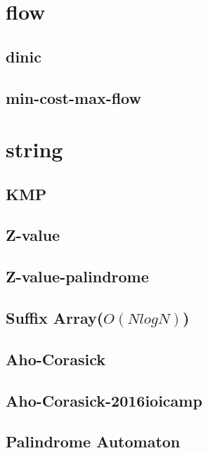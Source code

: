 \documentclass[12pt,twocolumn,oneside,a4paper]{article}
\begin{document}
\section{flow}
\subsection{dinic}


\subsection{min-cost-max-flow}


\section{string}
\subsection{KMP}


\subsection{Z-value}


\subsection{Z-value-palindrome}


\subsection{Suffix Array(\(O(N log N)\))}


\subsection{Aho-Corasick}


\subsection{Aho-Corasick-2016ioicamp}


\subsection{Palindrome Automaton}

\end{document}
